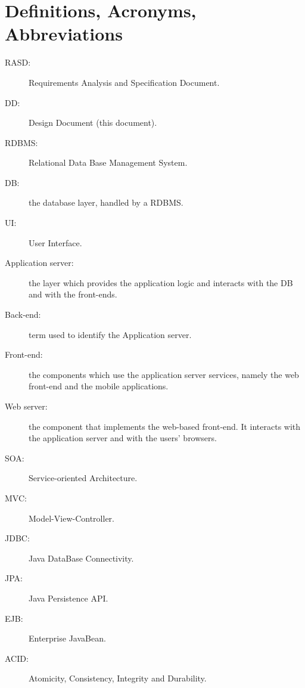 \section{Definitions, Acronyms, Abbreviations}
\label{sec:definitions}

\begin{description}
\item[RASD:] Requirements Analysis and Specification Document.
\item[DD:] Design Document (this document).
\item[RDBMS:] Relational Data Base Management System.
\item[DB:] the database layer, handled by a RDBMS.
\item[UI:] User Interface.
\item[Application server:] the layer which provides the application logic and interacts with the DB and with the front-ends.
\item[Back-end:] term used to identify the Application server.
\item[Front-end:] the components which use the application server services, namely the web front-end and the mobile applications.
\item[Web server:] the component that implements the web-based front-end. It interacts with the application server and with the users' browsers.
\item[SOA:] Service-oriented Architecture.
\item[MVC:] Model-View-Controller.
\item[JDBC:] Java DataBase Connectivity.
\item[JPA:] Java Persistence API.
\item[EJB:] Enterprise JavaBean.
\item[ACID:] Atomicity, Consistency, Integrity and Durability.
\end{description}
